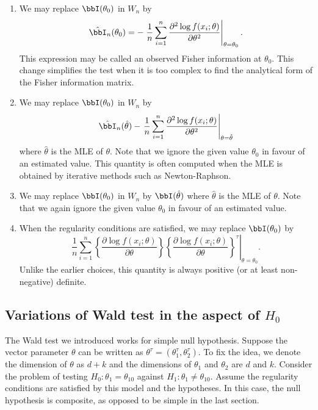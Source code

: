 \begin{enumerate}
\item
We may replace $\bbI(\theta_0)$ in $W_n$ by
\[
\hat{\bbI}_n(\theta_0)
=
- \left .
\frac{1}{n} \sum_{i=1}^n \frac{\partial^2 \log f(x_i; \theta)}{\partial \theta^2} 
\right |_{\theta = \theta_0}.
\]
This expression may be called an observed Fisher information at $\theta_0$.
This change simplifies the test when it is too complex to
find the analytical form of the Fisher information matrix.

\item
We may replace $\bbI(\theta_0)$ in $W_n$ by
\[
\hat{\bbI}_n(\hat \theta)
- \left .
\frac{1}{n} \sum_{i=1}^n \frac{\partial^2 \log f(x_i; \theta)}{\partial \theta^2} 
\right |_{\theta = \hat \theta}
\]
where $\hat \theta$ is the MLE of $\theta$. Note that we ignore
the given value $\theta_0$ in favour of an estimated value.
This quantity is often computed when the MLE is obtained by
iterative methods such as Newton-Raphson.

\item
We may replace $\bbI(\theta_0)$ in $W_n$ by $\bbI(\hat \theta)$ where 
$\hat \theta$ is the MLE of $\theta$. Note that we again ignore
the given value $\theta_0$ in favour of an estimated value.

\item
When the regularity conditions are satisfied, 
we may replace $\bbI(\theta_0)$ by
 \[
\left .
\frac{1}{n} \sum_{i=1}^n 
\left \{ \frac{\partial\log f(x_i; \theta)}{\partial \theta} \right \}
\left \{ \frac{\partial\log f(x_i; \theta)}{\partial \theta} \right \}^\tau
\right |_{\theta = \theta_0}.
\]
Unlike the earlier choices, this quantity is 
always positive (or at least non-negative) definite.
\end{enumerate}

\subsection{Variations of Wald test in the aspect of $H_0$}
The Wald test we introduced works for simple null hypothesis.
Suppose the vector parameter $\theta$ can be written as 
$\theta^\tau = (\theta_1^\tau, \theta_2^\tau)$.
To fix the idea, we denote the dimension of $\theta$ as 
$d+k$ and the dimensions of
$\theta_1$ and $\theta_2$ are $d$ and $k$.
Consider the problem of testing
$H_0: \theta_1 = \theta_{10}$ against 
$H_1: \theta_1 \neq \theta_{10}$.
Assume the regularity conditions are satisfied by this
model and the hypotheses. In this case, the null hypothesis
is composite, as opposed to be simple in the last section.

